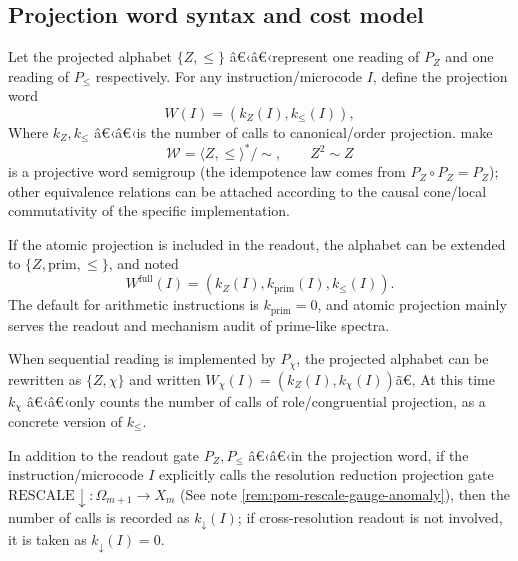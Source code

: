 \subsection{Projection word syntax and cost model}\label{subsec:pom-words}
\begin{definition}\label{def:pom-projection-word}
Let the projected alphabet $\{Z,\le\}$ â€‹â€‹represent one reading of $P_Z$ and one reading of $P_{\le}$ respectively. For any instruction/microcode $I$, define the projection word
\[
W(I)=(k_Z(I),k_{\le}(I)),
\]
Where $k_Z,k_{\le}$ â€‹â€‹is the number of calls to canonical/order projection. make
\[
\mathcal{W}=\langle Z,\le\rangle^*/\sim,\qquad Z^2\sim Z
\]
is a projective word semigroup (the idempotence law comes from $P_Z\circ P_Z=P_Z$); other equivalence relations can be attached according to the causal cone/local commutativity of the specific implementation.
\end{definition}

\begin{remark}\label{rem:pom-word-prim}
If the atomic projection is included in the readout, the alphabet can be extended to $\{Z,\mathrm{prim},\le\}$, and noted
\[
W^{\mathrm{full}}(I)=(k_Z(I),k_{\mathrm{prim}}(I),k_{\le}(I)).
\]
The default for arithmetic instructions is $k_{\mathrm{prim}}=0$, and atomic projection mainly serves the readout and mechanism audit of prime-like spectra.
\end{remark}

\begin{remark}\label{rem:pom-word-chi}
When sequential reading is implemented by $P_\chi$, the projected alphabet can be rewritten as $\{Z,\chi\}$ and written
\(
W_\chi(I)=(k_Z(I),k_\chi(I))
\)ã€‚
At this time $k_\chi$ â€‹â€‹only counts the number of calls of role/congruential projection, as a concrete version of $k_{\le}$.
\end{remark}

\begin{definition}\label{def:pom-rescale-count}
In addition to the readout gate $P_Z,P_{\le}$ â€‹â€‹in the projection word, if the instruction/microcode $I$ explicitly calls the resolution reduction projection gate
\(
\mathrm{RESCALE}\downarrow:\Omega_{m+1}\to X_m
\)
(See note \ref{rem:pom-rescale-gauge-anomaly}), then the number of calls is recorded as $k_{\downarrow}(I)$; if cross-resolution readout is not involved, it is taken as $k_{\downarrow}(I)=0$.
\end{definition}

